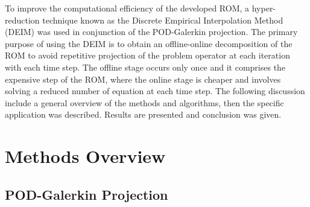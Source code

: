 \documentclass[]{interact}
\theoremstyle{plain}%
\theoremstyle{definition}
\theoremstyle{remark}
\begin{document}
To improve the computational efficiency of the developed ROM, a hyper-reduction technique known as the Discrete Empirical Interpolation Method (DEIM) was used in conjunction of the POD-Galerkin projection.
The primary purpose of using the DEIM is to obtain an offline-online decomposition of the ROM to avoid repetitive projection of the problem operator at each iteration with each time step.
The offline stage occurs only once and it comprises the expensive step of the ROM, where the online stage is cheaper and involves solving a reduced number of equation at each time step.
The following discussion include a general overview of the methods and algorithms, then the specific application was described.
Results are presented and conclusion was given.

\section{Methods Overview}

\subsection{POD-Galerkin Projection}\label{class}
\end{document}
